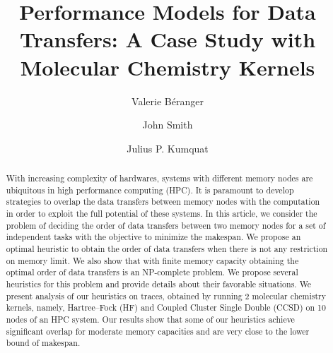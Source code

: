 \documentclass[sigconf]{acmart}
\begin{document}
	
	\title{Performance Models for Data Transfers: A Case Study with Molecular Chemistry Kernels}
	
	\author{Valerie B\'eranger}
	\author{John Smith}
	
	\author{Julius P. Kumquat}
	
	\renewcommand{\shortauthors}{Trovato and Tobin, et al.}
	
	\begin{abstract}
		With increasing complexity of hardwares, systems with different memory nodes are ubiquitous in high performance computing (HPC). It is paramount to develop strategies to overlap the data transfers between memory nodes with the computation in order to exploit the full potential of these systems. In this article, we consider the problem of deciding the  order of data transfers between two memory nodes for a set of independent tasks  with the objective to minimize the makespan. We propose an optimal heuristic to obtain the order of data transfers when there is not any restriction on memory limit. We also show that with finite memory capacity obtaining the optimal order of data transfers is an NP-complete problem. We propose several heuristics for this problem and provide details about their favorable situations. We present analysis of our heuristics on traces, obtained by running 2 molecular chemistry kernels, namely, Hartree–Fock (HF)  and Coupled Cluster Single Double (CCSD) on 10 nodes of an HPC system. Our results show that some of our heuristics achieve significant overlap for moderate memory capacities and are very close to the lower bound of makespan.
	\end{abstract}
	
	
\end{document}

